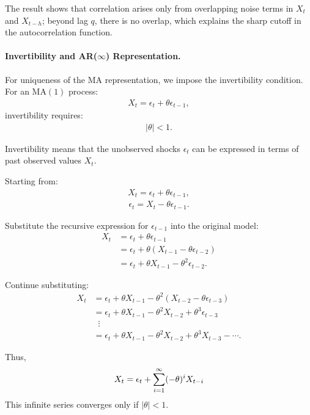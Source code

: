 \documentclass[10pt,a4paper]{article}
\begin{document}
	The result shows that correlation arises only from overlapping noise terms in $X_t$ and $X_{t-h}$; beyond lag $q$, there is no overlap, which explains the sharp cutoff in the autocorrelation function.
	
	\paragraph{Invertibility and AR($\infty$) Representation.}
	
	For uniqueness of the MA representation, we impose the invertibility condition. For an MA$(1)$ process:
	\begin{align*}
	X_t = \epsilon_t + \theta \epsilon_{t-1},
	\end{align*}
	invertibility requires:
	\begin{align*}
	|\theta| < 1.
	\end{align*}
	
	
	Invertibility means that the unobserved shocks $\epsilon_t$ can be expressed in terms of past observed values $X_t$.
	
	
	Starting from:
	\begin{align*}
	X_t = \epsilon_t + \theta \epsilon_{t-1},
	\end{align*}
	\begin{align*}
	\epsilon_t = X_t - \theta \epsilon_{t-1}.
	\end{align*}
	
	Substitute the recursive expression for $\epsilon_{t-1}$ into the original model:
	\begin{align*}
	X_t &= \epsilon_t + \theta \epsilon_{t-1} \\
	&= \epsilon_t + \theta (X_{t-1} - \theta \epsilon_{t-2}) \\
	&= \epsilon_t + \theta X_{t-1} - \theta^2 \epsilon_{t-2}.
	\end{align*}
	
	Continue substituting:
	\begin{align*}
	X_t 
	&= \epsilon_t + \theta X_{t-1} - \theta^2 (X_{t-2} - \theta \epsilon_{t-3}) \\
	&= \epsilon_t + \theta X_{t-1} - \theta^2 X_{t-2} + \theta^3 \epsilon_{t-3} \\
	&\;\;\vdots \\
	&= \epsilon_t + \theta X_{t-1} - \theta^2 X_{t-2} + \theta^3 X_{t-3} - \cdots.
	\end{align*}
	
	Thus,
	\begin{align*}
	\large X_t = \epsilon_t + \sum_{i=1}^{\infty} (-\theta)^i X_{t-i}
	\end{align*}
	This infinite series converges only if $|\theta| < 1$.
	
\end{document}
